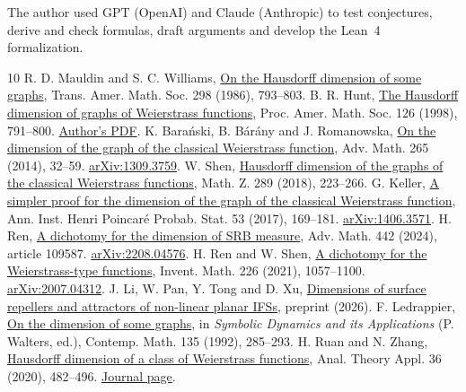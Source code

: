 \documentclass[11pt,a4paper]{article}
\begin{document}
The author used GPT (OpenAI) and Claude (Anthropic) to test conjectures,
derive and check formulas, draft arguments and develop the Lean~4
formalization.

\begin{thebibliography}{10}
 R. D. Mauldin and S. C. Williams, \href{https://sites.itservices.cas.unt.edu/~mauldin/papers/no60.pdf}{On the Hausdorff dimension of some graphs}, Trans. Amer. Math. Soc. 298 (1986), 793--803.
 B. R. Hunt, \href{https://doi.org/10.1090/S0002-9939-98-04387-1}{The Hausdorff dimension of graphs of Weierstrass functions}, Proc. Amer. Math. Soc. 126 (1998), 791--800.
\href{https://user.eng.umd.edu/~bhunt/papers/hdimw.pdf}{Author's PDF}.
 K. Bara\'nski, B. B\'ar\'any and J. Romanowska,
\href{https://doi.org/10.1016/j.aim.2014.07.033}{On the dimension of
the graph of the classical Weierstrass function}, Adv. Math. 265
(2014), 32--59.
\href{https://arxiv.org/abs/1309.3759}{arXiv:1309.3759}.
 W. Shen, \href{https://arxiv.org/abs/1505.03986}{Hausdorff dimension of the graphs of the classical Weierstrass functions}, Math. Z. 289 (2018), 223--266.
 G. Keller, \href{https://doi.org/10.1214/15-AIHP711}{A simpler proof for the dimension of the graph of the classical Weierstrass function}, Ann. Inst. Henri Poincar\'e Probab. Stat. 53 (2017), 169--181.
\href{https://arxiv.org/abs/1406.3571}{arXiv:1406.3571}.
 H. Ren, \href{https://doi.org/10.1016/j.aim.2024.109587}{A dichotomy for the dimension of SRB measure}, Adv. Math. 442 (2024), article 109587.
\href{https://arxiv.org/abs/2208.04576}{arXiv:2208.04576}.
 H. Ren and W. Shen,
\href{https://doi.org/10.1007/s00222-021-01060-2}{A dichotomy for the
Weierstrass-type functions}, Invent. Math. 226 (2021), 1057--1100.
\href{https://arxiv.org/abs/2007.04312}{arXiv:2007.04312}.
 J. Li, W. Pan, Y. Tong and D. Xu, \href{https://arxiv.org/abs/2608.30744}{Dimensions of surface repellers and attractors of non-linear planar IFSs}, preprint (2026).
 F. Ledrappier, \href{https://doi.org/10.1090/conm/135/1185095}{On the dimension of some graphs}, in \emph{Symbolic Dynamics and its Applications} (P. Walters, ed.), Contemp. Math. 135 (1992), 285--293.
 H. Ruan and N. Zhang, \href{https://doi.org/10.4208/ata.OA-SU8}{Hausdorff dimension of a class of Weierstrass functions}, Anal. Theory Appl. 36 (2020), 482--496.
\href{https://www.global-sci.com/ata/article/view/8206}{Journal page}.
\end{thebibliography}
\end{document}
